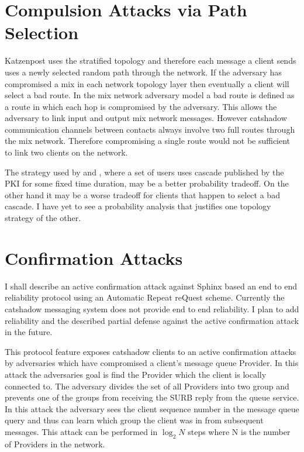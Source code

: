 \documentclass[conference]{IEEEtran}
\begin{document}
\section{Compulsion Attacks via Path Selection}
Katzenpost uses the stratified topology and therefore each message a
client sends uses a newly selected random path through the network. If
the adversary has compromised a mix in each network topology layer
then eventually a client will select a bad route. In the mix network
adversary model a bad route is defined as a route in which each hop is
compromised by the adversary. This allows the adversary to link input
and output mix network messages. However catshadow communication channels
between contacts always involve two full routes through the mix network.
Therefore compromising a single route would not be sufficient to link two
clients on the network.

The strategy used by \cite{cryptoeprint:2016:489} and
\cite{cryptoeprint:2017:1000}, where a set of users uses cascade
published by the PKI for some fixed time duration, may be a better
probability tradeoff. On the other hand it may be a worse tradeoff
for clients that happen to select a bad cascade. I have yet to see a
probability analysis that justifies one topology strategy of the other.

\section{Confirmation Attacks}
I shall describe an active confirmation attack against Sphinx based an
end to end reliability protocol using an Automatic Repeat reQuest
scheme. Currently the catshadow messaging system does not provide end
to end reliability. I plan to add reliability and the described
partial defense against the active confirmation attack in the future.

This protocol feature exposes catshadow clients to an active
confirmation attacks by adversaries which have compromised a client's
message queue Provider. In this attack the adversaries goal is find
the Provider which the client is locally connected to. The adversary
divides the set of all Providers into two group and prevents one of
the groups from receiving the SURB reply from the queue service. In
this attack the adversary sees the client sequence number in the
message queue query and thus can learn which group the client was in
from subsequent messages. This attack can be performed in $\log_{2}N$
steps where N is the number of Providers in the network.
\end{document}
